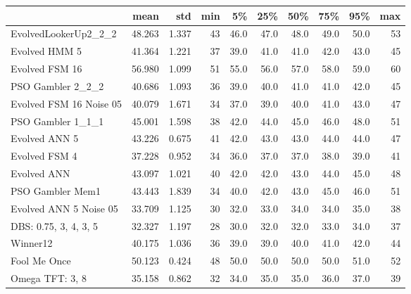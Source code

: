 \begin{tabular}{lrrrrrrrrr}
\toprule
{} &    mean &    std &  min &    5\% &   25\% &   50\% &   75\% &   95\% &  max \\
\midrule
EvolvedLookerUp2\_2\_2    &  48.263 &  1.337 &   43 &  46.0 &  47.0 &  48.0 &  49.0 &  50.0 &   53 \\
Evolved HMM 5           &  41.364 &  1.221 &   37 &  39.0 &  41.0 &  41.0 &  42.0 &  43.0 &   45 \\
Evolved FSM 16          &  56.980 &  1.099 &   51 &  55.0 &  56.0 &  57.0 &  58.0 &  59.0 &   60 \\
PSO Gambler 2\_2\_2       &  40.686 &  1.093 &   36 &  39.0 &  40.0 &  41.0 &  41.0 &  42.0 &   45 \\
Evolved FSM 16 Noise 05 &  40.079 &  1.671 &   34 &  37.0 &  39.0 &  40.0 &  41.0 &  43.0 &   47 \\
PSO Gambler 1\_1\_1       &  45.001 &  1.598 &   38 &  42.0 &  44.0 &  45.0 &  46.0 &  48.0 &   51 \\
Evolved ANN 5           &  43.226 &  0.675 &   41 &  42.0 &  43.0 &  43.0 &  44.0 &  44.0 &   47 \\
Evolved FSM 4           &  37.228 &  0.952 &   34 &  36.0 &  37.0 &  37.0 &  38.0 &  39.0 &   41 \\
Evolved ANN             &  43.097 &  1.021 &   40 &  42.0 &  42.0 &  43.0 &  44.0 &  45.0 &   48 \\
PSO Gambler Mem1        &  43.443 &  1.839 &   34 &  40.0 &  42.0 &  43.0 &  45.0 &  46.0 &   51 \\
Evolved ANN 5 Noise 05  &  33.709 &  1.125 &   30 &  32.0 &  33.0 &  34.0 &  34.0 &  35.0 &   38 \\
DBS: 0.75, 3, 4, 3, 5   &  32.327 &  1.197 &   28 &  30.0 &  32.0 &  32.0 &  33.0 &  34.0 &   37 \\
Winner12                &  40.175 &  1.036 &   36 &  39.0 &  39.0 &  40.0 &  41.0 &  42.0 &   44 \\
Fool Me Once            &  50.123 &  0.424 &   48 &  50.0 &  50.0 &  50.0 &  50.0 &  51.0 &   52 \\
Omega TFT: 3, 8         &  35.158 &  0.862 &   32 &  34.0 &  35.0 &  35.0 &  36.0 &  37.0 &   39 \\
\bottomrule
\end{tabular}

